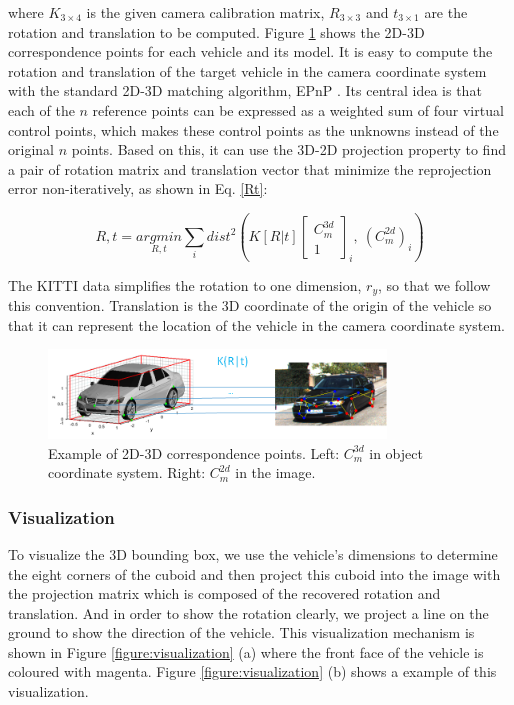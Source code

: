 \documentclass[a4paper,12pt]{article}
\begin{document}
where $K_{3\times 4}$ is the given camera calibration matrix, $R_{3\times 3}$ and $t_{3\times 1}$ are the rotation and translation to be computed. Figure \ref{figure:corresp} shows the 2D-3D correspondence points for each vehicle and its model. It is easy to compute the rotation and translation of the target vehicle in the camera coordinate system with the standard 2D-3D matching algorithm, \ie EPnP \cite{Lepetit2008}. Its central idea is that each of the $n$ reference points can be expressed as a weighted sum of four virtual control points, which makes these control points as the unknowns instead of the original $n$ points. Based on this, it can use the 3D-2D projection property to find a pair of rotation matrix and translation vector that minimize the reprojection error non-iteratively, as shown in Eq. \ref{Rt}:

\begin{equation}
\label{Rt}
	R, t = \underset{R,t}{argmin}\sum_i dist^2(K[R|t]\begin{bmatrix} C_m^{3d} \\1  \end{bmatrix}_i, ~ (C_m^{2d})_i)
\end{equation}

The KITTI data simplifies the rotation to one dimension, $r_y$, so that we follow this convention. Translation is the 3D coordinate of the origin of the vehicle so that it can represent the location of the vehicle in the camera coordinate system.

\begin{figure}[H]		
	\includegraphics[width=0.8\textwidth]{corresp.png}
	\caption[Example of 2D-3D correspondence points.]{Example of 2D-3D correspondence points. Left: $C_m^{3d}$ in object coordinate system. Right: $C_m^{2d}$ in the image.}
	\centering
	\label{figure:corresp}
\end{figure}

\subsubsection{Visualization}
To visualize the 3D bounding box, we use the vehicle's dimensions to determine the eight corners of the cuboid and then project this cuboid into the image with the projection matrix which is composed of the recovered rotation and translation. And in order to show the rotation clearly, we project a line on the ground to show the direction of the vehicle. This visualization mechanism is shown in Figure \ref{figure:visualization} (a) where the front face of the vehicle is coloured with magenta. Figure \ref{figure:visualization} (b) shows a example of this visualization. 
\end{document}
